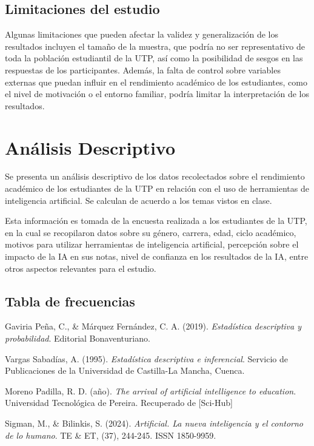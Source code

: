 \documentclass{article}
\newenvironment{metodologia}{}{}
\newenvironment{analisisDescriptivo}{}{}
\begin{document}
\begin{metodologia}
  \subsection{Limitaciones del estudio}

  Algunas limitaciones que pueden afectar la validez y generalización de los resultados incluyen el tamaño de la muestra, que podría no ser representativo de toda la población estudiantil de la UTP, así como la posibilidad de sesgos en las respuestas de los participantes. Además, la falta de control sobre variables externas que puedan influir en el rendimiento académico de los estudiantes, como el nivel de motivación o el entorno familiar, podría limitar la interpretación de los resultados.
\end{metodologia}

\newpage

\begin{analisisDescriptivo}

  \section{Análisis Descriptivo}

  Se presenta un análisis descriptivo de los datos recolectados sobre el rendimiento académico de los estudiantes de la UTP en relación con el uso de herramientas de inteligencia artificial. Se calculan de acuerdo a los temas vistos en clase.

  Esta información es tomada de la encuesta realizada a los estudiantes de la UTP, en la cual se recopilaron datos sobre su género, carrera, edad, ciclo académico, motivos para utilizar herramientas de inteligencia artificial, percepción sobre el impacto de la IA en sus notas, nivel de confianza en los resultados de la IA, entre otros aspectos relevantes para el estudio.

  \subsection{Tabla de frecuencias}

  
\end{analisisDescriptivo}

\newpage

\begin{thebibliography}{9}

  Gaviria Peña, C., \& Márquez Fernández, C. A. (2019). \textit{Estadística descriptiva y probabilidad}. Editorial Bonaventuriano. 
  
  Vargas Sabadías, A. (1995). \textit{Estadística descriptiva e inferencial}. Servicio de Publicaciones de la Universidad de Castilla-La Mancha, Cuenca.

  Moreno Padilla, R. D. (año). \textit{The arrival of artificial intelligence to education}. Universidad Tecnológica de Pereira. Recuperado de [Sci-Hub]

  Sigman, M., \& Bilinkis, S. (2024). \textit{Artificial. La nueva inteligencia y el contorno de lo humano}. TE \& ET, (37), 244-245. ISSN 1850-9959.

\end{thebibliography}

  
\end{document}
